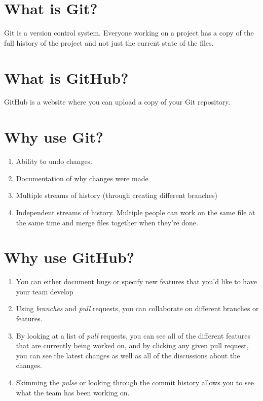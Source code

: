 \documentclass{article}
\begin{document}
\section{What is Git?}
Git is a version control system.  Everyone working on a project has a copy of the full history of the project and not just the current state of the files.

\section{What is GitHub?}
GitHub is a website where you can upload a copy of your Git repository.  

\section{Why use Git?}
\begin{enumerate}
\item Ability to undo changes.
\item Documentation of why changes were made
\item Multiple streams of history (through creating different branches)
\item Independent streams of history.  Multiple people can work on the same file at the same time and merge files together when they're done.
\end{enumerate}

\section{Why use GitHub?}
\begin{enumerate}
\item You can either document bugs or specify new features that you’d like to have your team develop
\item Using  \textit{branches} and  \textit{pull} requests, you can collaborate on different branches or features.
\item By looking at a list of \textit{pull} requests, you can see all of the different features that are currently being worked on, and by clicking any given pull request, you can see the latest changes as well as all of the discussions about the changes.
\item Skimming the  \textit{pulse} or looking through the commit history allows you to see what the team has been working on.
\end{enumerate}
\end{document}
